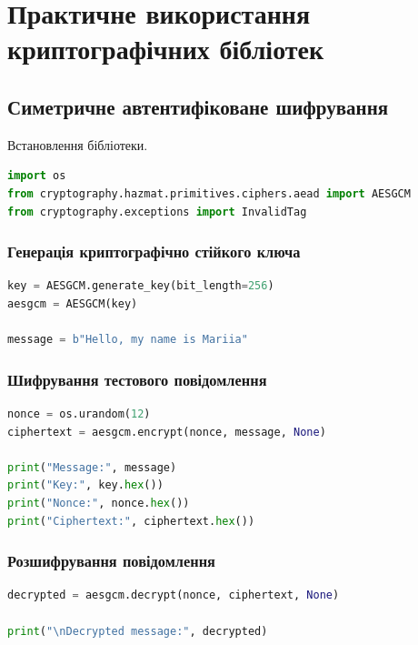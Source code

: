 \section{Практичне використання криптографічних бібліотек}
\subsection{Симетричне автентифіковане шифрування}

Встановлення бібліотеки.
\begin{lstlisting}[language=Python]
import os
from cryptography.hazmat.primitives.ciphers.aead import AESGCM
from cryptography.exceptions import InvalidTag
\end{lstlisting}

\subsubsection{Генерація криптографічно стійкого ключа}

\begin{lstlisting}[language=Python]
key = AESGCM.generate_key(bit_length=256)
aesgcm = AESGCM(key)

message = b"Hello, my name is Mariia"
\end{lstlisting}

\subsubsection{Шифрування тестового повідомлення}

\begin{lstlisting}[language=Python]
nonce = os.urandom(12)
ciphertext = aesgcm.encrypt(nonce, message, None)

print("Message:", message)
print("Key:", key.hex())
print("Nonce:", nonce.hex())
print("Ciphertext:", ciphertext.hex())

\end{lstlisting}

\subsubsection{Розшифрування повідомлення}

\begin{lstlisting}[language=Python]
decrypted = aesgcm.decrypt(nonce, ciphertext, None)

print("\nDecrypted message:", decrypted)
\end{lstlisting}

